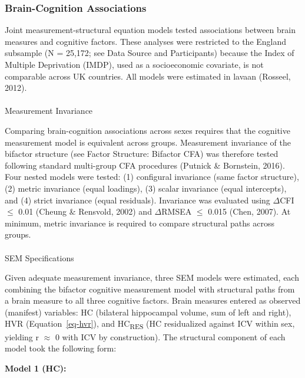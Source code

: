 \documentclass[
]{article}
\makeatletter
\let\oldparagraph\paragraph
\renewcommand{\paragraph}{
    \@ifstar
      \xxxParagraphStar
      \xxxParagraphNoStar
  }
\newcommand{\xxxParagraphStar}[1]{\oldparagraph*{#1}\mbox{}}
\newcommand{\xxxParagraphNoStar}[1]{\oldparagraph{#1}\mbox{}}
\makeatother
\begin{document}
\subsubsection{Brain-Cognition
Associations}\label{brain-cognition-associations}

Joint measurement-structural equation models tested associations between
brain measures and cognitive factors. These analyses were restricted to
the England subsample (N = 25,172; see Data Source and Participants)
because the Index of Multiple Deprivation (IMDP), used as a
socioeconomic covariate, is not comparable across UK countries. All
models were estimated in lavaan (Rosseel, 2012).

\paragraph{Measurement Invariance}\label{measurement-invariance}

Comparing brain-cognition associations across sexes requires that the
cognitive measurement model is equivalent across groups. Measurement
invariance of the bifactor structure (see Factor Structure: Bifactor
CFA) was therefore tested following standard multi-group CFA procedures
(Putnick \& Bornstein, 2016). Four nested models were tested: (1)
configural invariance (same factor structure), (2) metric invariance
(equal loadings), (3) scalar invariance (equal intercepts), and (4)
strict invariance (equal residuals). Invariance was evaluated using
\(\Delta\)CFI \(\leq\) 0.01 (Cheung \& Rensvold, 2002) and
\(\Delta\)RMSEA \(\leq\) 0.015 (Chen, 2007). At minimum, metric
invariance is required to compare structural paths across groups.

\paragraph{SEM Specifications}\label{sem-specifications}

Given adequate measurement invariance, three SEM models were estimated,
each combining the bifactor cognitive measurement model with structural
paths from a brain measure to all three cognitive factors. Brain
measures entered as observed (manifest) variables: HC (bilateral
hippocampal volume, sum of left and right), HVR (Equation~\ref{eq-hvr}),
and HC\textsubscript{RES} (HC residualized against ICV within sex,
yielding r \(\approx\) 0 with ICV by construction). The structural
component of each model took the following form:

\textbf{Model 1 (HC):}
\end{document}
